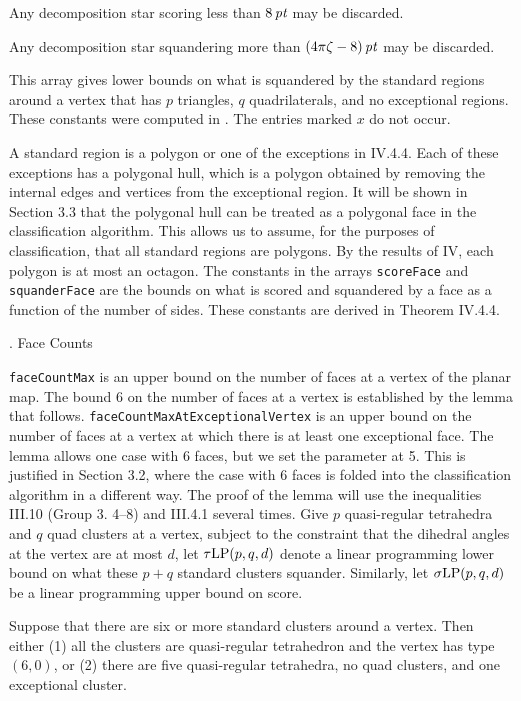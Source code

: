  \endsubhead
Any decomposition star scoring less than $8\,\hbox{\it pt}$ may be discarded.

 \endsubhead
Any decomposition star squandering more than $(4\pi\zeta-8)\,\hbox{\it pt}$ may be
discarded.

\endsubhead
This array gives lower bounds on what is squandered by the
standard regions around a vertex that has $p$ triangles, $q$
quadrilaterals, and no exceptional regions.  These constants
were computed in \cite{III.5.1}.  The entries marked $x$ do not
occur.

 \endsubhead
A standard region is a polygon or one of the exceptions in IV.4.4.
Each of these exceptions has a polygonal hull, which is a polygon
obtained by removing the internal edges and vertices from the exceptional
region.
It will be shown in Section 3.3 that the polygonal hull can be treated
as a polygonal face in the classification algorithm.  This allows
us to assume, for the purposes of classification, that all standard
regions are polygons.  By the results of IV, each polygon is at most
an octagon.  The constants in the arrays {\tt scoreFace} and 
{\tt squanderFace} are the bounds on what is scored and squandered
by a face as a function of the number of sides.  These constants
are derived in Theorem IV.4.4.

. Face Counts\endsubhead

{\tt faceCountMax} is an upper bound on the number of faces at a vertex
of the planar map.  The bound $6$ on the number of faces at a vertex
is established by the lemma that follows.  {\tt faceCountMaxAtExceptionalVertex}
is an upper bound on the number of faces at a vertex at which there
is at least one exceptional face.  The lemma allows one case
with 6 faces, but we set the parameter at 5.  This is justified
in Section 3.2, where the case with 6 faces is folded into the
classification algorithm in a different way.  The proof of the lemma
will use the inequalities III.10 (Group 3. 4--8) and
III.4.1 several times.
Give $p$ quasi-regular tetrahedra and $q$ quad clusters at a vertex,
subject to the constraint that the dihedral angles at the vertex are
at most $d$, let $\operatorname{\hbox{$\tau$}LP}(p,q,d)$ denote a linear programming lower bound
on what these $p+q$ standard clusters squander.  Similarly,
let $\operatorname{\hbox{$\sigma$}LP}(p,q,d)$ be a linear programming upper bound on score.


  Suppose that there are six or more standard
clusters around a vertex.  Then either (1) all the clusters are
quasi-regular tetrahedron and the vertex has type $(6,0)$, or
(2) there are five quasi-regular tetrahedra, no quad clusters,
and one exceptional cluster.
\endproclaim

